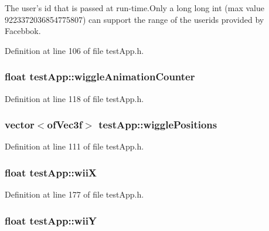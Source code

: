 The user's id that is passed at run-\/time.\-Only a long long int (max value 9223372036854775807) can support the range of the userids provided by Facebbok. 



Definition at line 106 of file test\-App.\-h.

\hypertarget{classtest_app_a6073b33be7847d675ec089a1d514c506}{
\subsubsection[{wiggle\-Animation\-Counter}]{\setlength{\rightskip}{0pt plus 5cm}float test\-App\-::wiggle\-Animation\-Counter}}\label{classtest_app_a6073b33be7847d675ec089a1d514c506}


Definition at line 118 of file test\-App.\-h.

\hypertarget{classtest_app_a5495d37f44bb3e3b00a04ad5910e0a6b}{
\subsubsection[{wiggle\-Positions}]{\setlength{\rightskip}{0pt plus 5cm}vector$<$of\-Vec3f$>$ test\-App\-::wiggle\-Positions}}\label{classtest_app_a5495d37f44bb3e3b00a04ad5910e0a6b}


Definition at line 111 of file test\-App.\-h.

\hypertarget{classtest_app_a7a77e8633c3a94e3e409a33a5cd9ae3f}{
\subsubsection[{wii\-X}]{\setlength{\rightskip}{0pt plus 5cm}float test\-App\-::wii\-X}}\label{classtest_app_a7a77e8633c3a94e3e409a33a5cd9ae3f}


Definition at line 177 of file test\-App.\-h.

\hypertarget{classtest_app_a5ae41896388ae16ee530beca5333e02a}{
\subsubsection[{wii\-Y}]{\setlength{\rightskip}{0pt plus 5cm}float test\-App\-::wii\-Y}}\label{classtest_app_a5ae41896388ae16ee530beca5333e02a}


